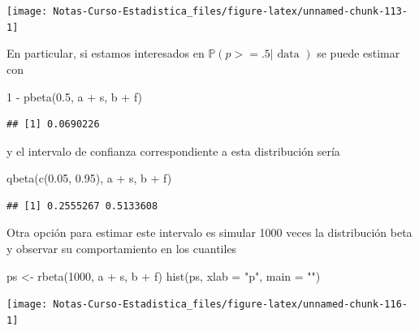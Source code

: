 \documentclass[
  12pt,
]{book}
\newenvironment{Shaded}{\begin{snugshade}}{\end{snugshade}}
\newcommand{\AttributeTok}[1]{\textcolor[rgb]{0.77,0.63,0.00}{#1}}
\newcommand{\DecValTok}[1]{\textcolor[rgb]{0.00,0.00,0.81}{#1}}
\newcommand{\FloatTok}[1]{\textcolor[rgb]{0.00,0.00,0.81}{#1}}
\newcommand{\FunctionTok}[1]{\textcolor[rgb]{0.00,0.00,0.00}{#1}}
\newcommand{\NormalTok}[1]{#1}
\newcommand{\OtherTok}[1]{\textcolor[rgb]{0.56,0.35,0.01}{#1}}
\newcommand{\SpecialCharTok}[1]{\textcolor[rgb]{0.00,0.00,0.00}{#1}}
\newcommand{\StringTok}[1]{\textcolor[rgb]{0.31,0.60,0.02}{#1}}
\theoremstyle{definition}
\theoremstyle{definition}
\theoremstyle{definition}
\theoremstyle{remark}
\begin{document}
\begin{center}\texttt{[image: Notas-Curso-Estadistica\_files/figure-latex/unnamed-chunk-113-1]} \end{center}

En particular, si estamos interesados en \(\mathbb{P}(p>=.5 | \text {  data })\) se puede estimar con

\begin{Shaded}
\begin{Highlighting}[]
\DecValTok{1} \SpecialCharTok{{-}} \FunctionTok{pbeta}\NormalTok{(}\FloatTok{0.5}\NormalTok{, a }\SpecialCharTok{+}\NormalTok{ s, b }\SpecialCharTok{+}\NormalTok{ f)}
\end{Highlighting}
\end{Shaded}

\begin{verbatim}
## [1] 0.0690226
\end{verbatim}

y el intervalo de confianza correspondiente a esta distribución sería

\begin{Shaded}
\begin{Highlighting}[]
\FunctionTok{qbeta}\NormalTok{(}\FunctionTok{c}\NormalTok{(}\FloatTok{0.05}\NormalTok{, }\FloatTok{0.95}\NormalTok{), a }\SpecialCharTok{+}\NormalTok{ s, b }\SpecialCharTok{+}\NormalTok{ f)}
\end{Highlighting}
\end{Shaded}

\begin{verbatim}
## [1] 0.2555267 0.5133608
\end{verbatim}

Otra opción para estimar este intervalo es simular 1000 veces la
distribución beta y observar su comportamiento en los cuantiles

\begin{Shaded}
\begin{Highlighting}[]
\NormalTok{ps }\OtherTok{\textless{}{-}} \FunctionTok{rbeta}\NormalTok{(}\DecValTok{1000}\NormalTok{, a }\SpecialCharTok{+}\NormalTok{ s, b }\SpecialCharTok{+}\NormalTok{ f)}
\FunctionTok{hist}\NormalTok{(ps, }\AttributeTok{xlab =} \StringTok{"p"}\NormalTok{, }\AttributeTok{main =} \StringTok{""}\NormalTok{)}
\end{Highlighting}
\end{Shaded}

\begin{center}\texttt{[image: Notas-Curso-Estadistica\_files/figure-latex/unnamed-chunk-116-1]} \end{center}
\end{document}

